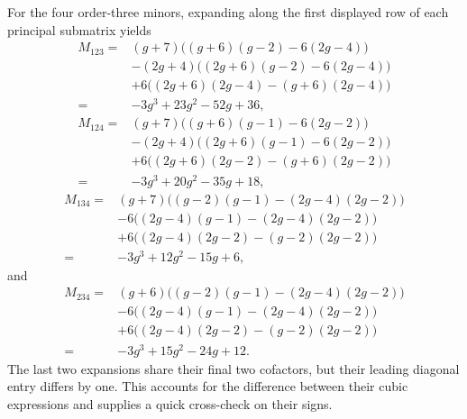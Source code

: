 \documentclass[11pt]{article}
\theoremstyle{remark}
\numberwithin{equation}{section}
\begin{document}
For the four order-three minors, expanding along the first displayed row of
each principal submatrix yields
\begin{equation}\label{eq:three-minor-123}
\begin{aligned}
M_{123}
={}&(g+7)\bigl((g+6)(g-2)-6(2g-4)\bigr)\\
&-(2g+4)\bigl((2g+6)(g-2)-6(2g-4)\bigr)\\
&+6\bigl((2g+6)(2g-4)-(g+6)(2g-4)\bigr)\\
={}&-3g^3+23g^2-52g+36,
\end{aligned}
\end{equation}
\begin{equation}\label{eq:three-minor-124}
\begin{aligned}
M_{124}
={}&(g+7)\bigl((g+6)(g-1)-6(2g-2)\bigr)\\
&-(2g+4)\bigl((2g+6)(g-1)-6(2g-2)\bigr)\\
&+6\bigl((2g+6)(2g-2)-(g+6)(2g-2)\bigr)\\
={}&-3g^3+20g^2-35g+18,
\end{aligned}
\end{equation}
\begin{equation}\label{eq:three-minor-134}
\begin{aligned}
M_{134}
={}&(g+7)\bigl((g-2)(g-1)-(2g-4)(2g-2)\bigr)\\
&-6\bigl((2g-4)(g-1)-(2g-4)(2g-2)\bigr)\\
&+6\bigl((2g-4)(2g-2)-(g-2)(2g-2)\bigr)\\
={}&-3g^3+12g^2-15g+6,
\end{aligned}
\end{equation}
and
\begin{equation}\label{eq:three-minor-234}
\begin{aligned}
M_{234}
={}&(g+6)\bigl((g-2)(g-1)-(2g-4)(2g-2)\bigr)\\
&-6\bigl((2g-4)(g-1)-(2g-4)(2g-2)\bigr)\\
&+6\bigl((2g-4)(2g-2)-(g-2)(2g-2)\bigr)\\
={}&-3g^3+15g^2-24g+12.
\end{aligned}
\end{equation}
The last two expansions share their final two cofactors, but their leading
diagonal entry differs by one.  This accounts for the difference between
their cubic expressions and supplies a quick cross-check on their signs.
\end{document}
